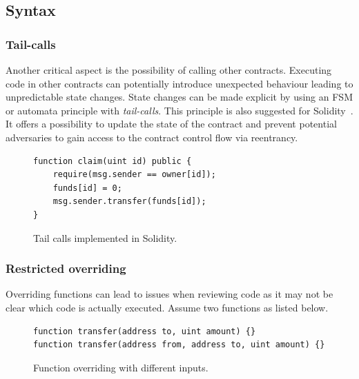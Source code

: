 \subsection{Syntax}
\subsubsection{Tail-calls}
Another critical aspect is the possibility of calling other contracts. Executing code in other contracts can potentially introduce unexpected behaviour leading to unpredictable state changes. State changes can be made explicit by using an FSM or automata principle with \emph{tail-calls}. This principle is also suggested for Solidity~\cite{ConsenSys2018Security}.
It offers a possibility to update the state of the contract and prevent potential adversaries to gain access to the contract control flow via reentrancy.

\begin{figure}[!h]
\begin{lstlisting}[language=Solidity]
function claim(uint id) public {
    require(msg.sender == owner[id]);
    funds[id] = 0;
    msg.sender.transfer(funds[id]);
}
\end{lstlisting}
\caption{Tail calls implemented in Solidity.}
\label{lst:tail-call}
\end{figure}



\subsubsection{Restricted overriding}
Overriding functions can lead to issues when reviewing code as it may not be clear which code is actually executed. Assume two functions as listed below.

\begin{figure}[!h]
\begin{lstlisting}[language=Solidity]
function transfer(address to, uint amount) {}
function transfer(address from, address to, uint amount) {}
\end{lstlisting}
\caption{Function overriding with different inputs.}
\label{lst:overriding}
\end{figure}

